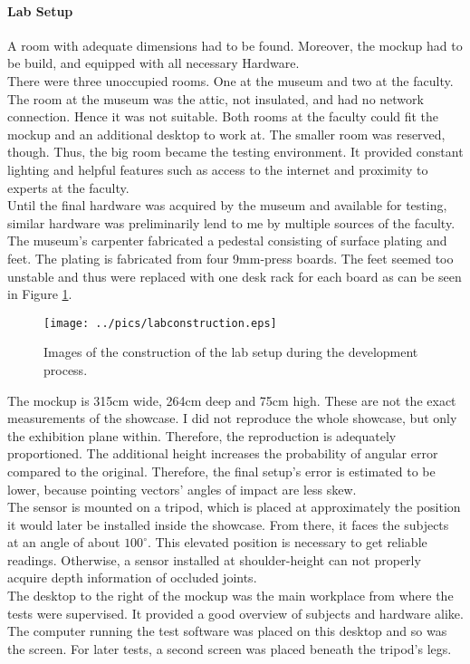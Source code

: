 \paragraph{Lab Setup} A room with adequate dimensions had to be found. Moreover, the mockup had to be build, and equipped with all necessary Hardware. 
\\
There were three unoccupied rooms. One at the museum and two at the faculty. The room at the museum was the attic, not insulated, and had no network connection. Hence it was not suitable. Both rooms at the faculty could fit the mockup and an additional desktop to work at. The smaller room was reserved, though. Thus, the big room became the testing environment. It provided constant lighting and helpful features such as access to the internet and proximity to experts at the faculty.
\\
Until the final hardware was acquired by the museum and available for testing, similar hardware was preliminarily lend to me by multiple sources of the faculty. The museum's carpenter fabricated a pedestal consisting of surface plating and feet. The plating is fabricated from four 9mm-press boards. The feet seemed too unstable and thus were replaced with one desk rack for each board as can be seen in Figure \ref{fig:lab_setup}.
\begin{figure}[H]%
\texttt{[image: ../pics/labconstruction.eps]}%
\caption{Images of the construction of the lab setup during the development process.}%
\label{fig:lab_setup} %
\end{figure}

The mockup is 315cm wide, 264cm deep and 75cm high. These are not the exact measurements of the showcase. I did not reproduce the whole showcase, but only the exhibition plane within. Therefore, the reproduction is adequately proportioned. The additional height increases the probability of angular error compared to the original. Therefore, the final setup's error is estimated to be lower, because pointing vectors' angles of impact are less skew.  
\\
The sensor is mounted on a tripod, which is placed at approximately the position it would later be installed inside the showcase. From there, it faces the subjects at an angle of about $100^\circ$. This elevated position is necessary to get reliable readings. Otherwise, a sensor installed at shoulder-height can not properly acquire depth information of occluded joints.
\\
The desktop to the right of the mockup was the main workplace from where the tests were supervised. It provided a good overview of subjects and hardware alike. The computer running the test software was placed on this desktop and so was the screen. For later tests, a second screen was placed beneath the tripod's legs.

